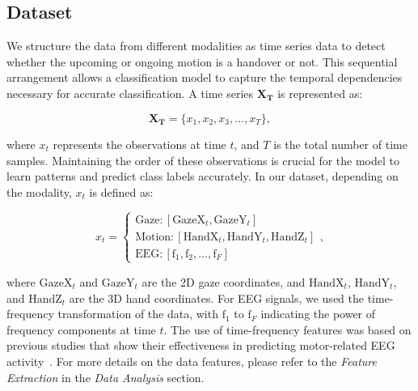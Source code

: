 \subsection*{Dataset}

We structure the data from different modalities as time series data to detect whether the upcoming or ongoing motion is a handover or not. This sequential arrangement allows a classification model to capture the temporal dependencies necessary for accurate classification. A time series \(\mathbf{X_T}\) is represented as:

\begin{equation}
    \mathbf{X_T} = \{x_1, x_2, x_3, \ldots, x_T\} ,
\end{equation}

\noindent where \(x_t\) represents the observations at time \(t\), and \(T\) is the total number of time samples. Maintaining the order of these observations is crucial for the model to learn patterns and predict class labels accurately. In our dataset, depending on the modality, \(x_t\) is defined as:

\begin{equation}
    x_t = 
    \begin{cases} 
    \text{Gaze}: [\text{GazeX}_t, \text{GazeY}_t] \\
    \text{Motion}: [\text{HandX}_t, \text{HandY}_t, \text{HandZ}_t] \\
    \text{EEG}: [\text{f}_1, \text{f}_2, ..., \text{f}_F]
    \end{cases},
\end{equation}

\noindent where \(\text{GazeX}_t\) and \(\text{GazeY}_t\) are the 2D gaze coordinates, and \(\text{HandX}_t\), \(\text{HandY}_t\), and \(\text{HandZ}_t\) are the 3D hand coordinates. For EEG signals, we used the time-frequency transformation of the data, with \(\text{f}_1\) to \(\text{f}_F\) indicating the power of frequency components at time \(t\). The use of time-frequency features was based on previous studies that show their effectiveness in predicting motor-related EEG activity~\cite{alazrai2017eeg, xu2018wavelet, MAMMONE2020source}. For more details on the data features, please refer to the \emph{Feature Extraction} in the \emph{Data Analysis} section.
